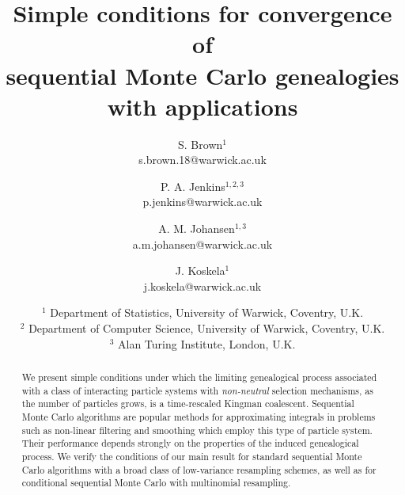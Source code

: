 \documentclass{article}
\theoremstyle{definition}
\newcommand{\1}[1]{\mathbbm{1}_{\{#1\}}}
\begin{document}
\title{Simple conditions for convergence of\\ sequential Monte Carlo genealogies with applications}

\author{S. Brown$^{1}$\\s.brown.18@warwick.ac.uk \and P. A. Jenkins$^{1,2,3}$\\p.jenkins@warwick.ac.uk \and A. M. Johansen$^{1,3}$\\a.m.johansen@warwick.ac.uk \and J. Koskela$^{1}$\\j.koskela@warwick.ac.uk} 

{\date{\small $^1$ Department of Statistics, University of Warwick, Coventry, U.K.\\[2pt]
$^2$ Department of Computer Science, University of Warwick, Coventry, U.K.\\[2pt]
$^3$ Alan Turing Institute, London, U.K.}}

\maketitle

\begin{abstract}
We present simple conditions under which the limiting genealogical process associated with a class of interacting particle systems with \emph{non-neutral} selection mechanisms, as the number of particles grows, is a time-rescaled Kingman coalescent. Sequential Monte Carlo algorithms are popular methods for approximating integrals in problems such as non-linear filtering and smoothing which employ this type of particle system. Their performance depends strongly on the properties of the induced genealogical process. We verify the conditions of our main result for standard sequential Monte Carlo algorithms with a broad class of low-variance resampling schemes, as well as for conditional sequential Monte Carlo with multinomial resampling.
\end{abstract}
\end{document}
